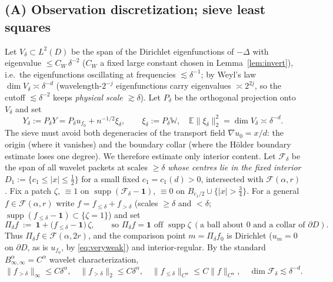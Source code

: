 \documentclass[11pt]{article}
\theoremstyle{remark}
\newcommand{\E}{\mathbb{E}}
\newcommand{\F}{\mathcal{F}}
\newcommand{\W}{\mathbb{W}}
\newcommand{\one}{\mathbf{1}}
\newcommand{\norm}[1]{\lVert #1\rVert}
\newcommand{\abs}[1]{\lvert #1\rvert}
\newcommand{\SET}[1]{\{#1\}}
\DeclareMathOperator{\supp}{supp}
\begin{document}
\subsection{(A) Observation discretization; sieve least squares}
Let $V_\delta\subset L^{2}(D)$ be the span of the Dirichlet eigenfunctions
of $-\Delta$ with eigenvalue $\le C_W\,\delta^{-2}$ ($C_W$ a fixed
large constant chosen in Lemma~\ref{lem:invert}), i.e.\ the eigenfunctions
oscillating at frequencies $\lesssim\delta^{-1}$; by Weyl's law
$\dim V_\delta\asymp\delta^{-d}$ (wavelength-$2^{-j}$ eigenfunctions carry
eigenvalues $\asymp2^{2j}$, so the cutoff $\lesssim\delta^{-2}$ keeps
\emph{physical scale $\gtrsim\delta$}). Let $P_\delta$ be the orthogonal
projection onto $V_\delta$ and set
\[
Y_\delta:=P_\delta Y=P_\delta u_{f_0}+n^{-1/2}\xi_\delta,
\qquad
\xi_\delta:=P_\delta\W,\quad \E\norm{\xi_\delta}_2^{2}=\dim V_\delta\asymp\delta^{-d}.
\]
The sieve must avoid both degeneracies of the transport field
$\nabla u_0=x/d$: the origin (where it vanishes) and the boundary
collar (where the H\"older boundary estimate loses one degree). We
therefore estimate only interior content.
Let $\F_\delta$ be the span
of all wavelet packets at scales $\ge\delta$ \emph{whose centres lie
in the fixed interior} $D_1:=\SET{c_1\le\abs{x}\le\tfrac12}$ for a small
fixed $c_1=c_1(d)>0$, intersected with $\F(\alpha,r)$. Fix a patch
$\zeta$, $\equiv1$ on $\operatorname{supp}(\F_\delta-\one)$,
$\equiv0$ on $B_{c_1/2}\cup\SET{\abs x>\tfrac34}$. For a general
$f\in\F(\alpha,r)$ write $f=f_{\le\delta}+f_{>\delta}$ (scales
$\ge\delta$ and $<\delta$; $\supp(f_{\le\delta}-\one)
\subset\SET{\zeta=1}$) and set
\begin{equation}\label{eq:Pidelta}
\Pi_\delta f\ :=\ \one+\bigl(f_{\le\delta}-\one\bigr)\,\zeta ,
\qquad\text{so }\Pi_\delta f=\one \text{ off }\operatorname{supp}\zeta\ (\text{a ball about }0\text{ and a collar of }\partial D).
\end{equation}
Thus $\Pi_\delta f\in\F(\alpha,2r)$, and the comparison point
$m=\Pi_\delta f_0$ is Dirichlet ($u_m=0$ on $\partial D$, as is
$u_{f_0}$, by \eqref{eq:veryweak}) and interior-regular. By the standard
$B^\alpha_{\infty,\infty}=C^\alpha$ wavelet characterization,
\begin{equation}\label{eq:approx}
\norm{f_{>\delta}}_{\infty}\le C\delta^{\alpha},
\quad
\norm{f_{>\delta}}_{2}\le C\delta^{\alpha},
\quad
\norm{f_{\le\delta}}_{C^\alpha}\le C\norm{f}_{C^\alpha},
\quad
\dim\F_\delta\lesssim\delta^{-d}.
\end{equation}
\end{document}
